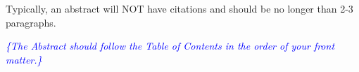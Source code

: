Typically, an abstract will NOT have citations and should be no longer than 2-3 paragraphs.

\textit{\textcolor{blue}{\{The Abstract should follow the Table of Contents in the order of your front matter.\}}}
